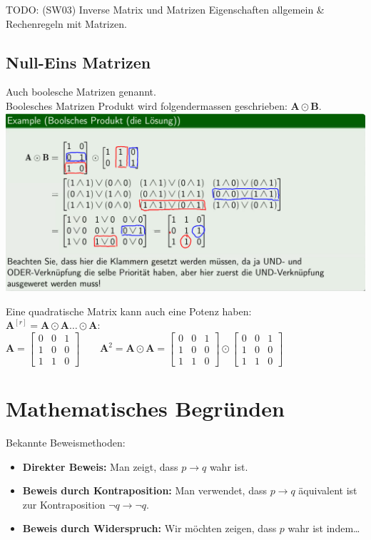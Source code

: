 \documentclass[12pt]{scrartcl}
\begin{document}
TODO: (SW03) Inverse Matrix und Matrizen Eigenschaften allgemein \& Rechenregeln mit Matrizen.

\subsection{Null-Eins Matrizen}
Auch boolesche Matrizen genannt.\\

Boolesches Matrizen Produkt wird folgendermassen geschrieben: $\mathbf{A} \odot  \mathbf{B}$.\\

\includegraphics[width=15cm]{img/boolesches_produkt.png}

\newpage
Eine quadratische Matrix kann auch eine Potenz haben:\\
$\mathbf{A}^{[r]} = \mathbf{A} \odot \mathbf{A} \dots \odot \mathbf{A}$:\\

\renewcommand{\arraystretch}{1}
$\mathbf{A} = 
\begin{bmatrix}
    0 & 0 & 1\\
    1 & 0 & 0\\
    1 & 1 & 0
\end{bmatrix}\quad\quad \mathbf{A}^2 = \mathbf{A} \odot \mathbf{A} = 
\begin{bmatrix}
    0 & 0 & 1\\
    1 & 0 & 0\\
    1 & 1 & 0
\end{bmatrix} 
\odot
\begin{bmatrix}
    0 & 0 & 1\\
    1 & 0 & 0\\
    1 & 1 & 0
\end{bmatrix}$

\newpage
\section{Mathematisches Begründen}
Bekannte Beweismethoden:
\begin{itemize}
    \item \textbf{Direkter Beweis:} Man zeigt, dass $p \rightarrow q$ wahr ist.
    \item \textbf{Beweis durch Kontraposition:} Man verwendet, dass $p \rightarrow q$ äquivalent ist zur Kontraposition
            $\lnot q \rightarrow \lnot q$.
    \item \textbf{Beweis durch Widerspruch:} Wir möchten zeigen, dass $p$ wahr ist indem\dots
\end{itemize}
\end{document}
